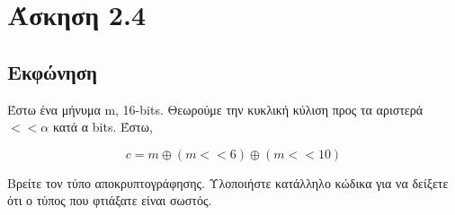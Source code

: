 \section{Άσκηση 2.4}

\subsection{Εκφώνηση} 

Έστω ένα μήνυμα m, 16-bits. Θεωρούμε την κυκλική κύλιση προς τα αριστερά $<< \alpha$ κατά α bits. Έστω,

\begin{equation}
    c = m \oplus (m<<6) \oplus (m<<10)
\end{equation}

Βρείτε τον τύπο αποκρυπτογράφησης. Υλοποιήστε κατάλληλο κώδικα για να δείξετε ότι ο τύπος που φτιάξατε είναι σωστός.